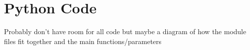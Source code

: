 \chapter{Python Code}

Probably don't have room for all code but maybe a diagram of how the module files fit together and the main functions/parameters